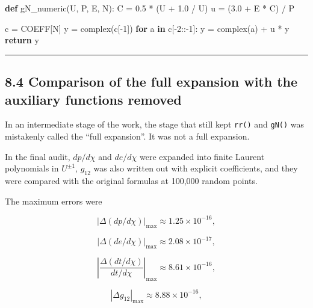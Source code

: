 \documentclass[
  a4paper,
]{article}
\newenvironment{Shaded}{}{}
\newcommand{\BuiltInTok}[1]{\textcolor[rgb]{0.00,0.50,0.00}{#1}}
\newcommand{\ControlFlowTok}[1]{\textcolor[rgb]{0.00,0.44,0.13}{\textbf{#1}}}
\newcommand{\DecValTok}[1]{\textcolor[rgb]{0.25,0.63,0.44}{#1}}
\newcommand{\FloatTok}[1]{\textcolor[rgb]{0.25,0.63,0.44}{#1}}
\newcommand{\KeywordTok}[1]{\textcolor[rgb]{0.00,0.44,0.13}{\textbf{#1}}}
\newcommand{\NormalTok}[1]{#1}
\newcommand{\OperatorTok}[1]{\textcolor[rgb]{0.40,0.40,0.40}{#1}}
\begin{document}
\begin{Shaded}
\begin{Highlighting}[]
\KeywordTok{def}\NormalTok{ gN\_numeric(U, P, E, N):}
\NormalTok{    C }\OperatorTok{=} \FloatTok{0.5} \OperatorTok{*}\NormalTok{ (U }\OperatorTok{+} \FloatTok{1.0} \OperatorTok{/}\NormalTok{ U)}
\NormalTok{    u }\OperatorTok{=}\NormalTok{ (}\FloatTok{3.0} \OperatorTok{+}\NormalTok{ E }\OperatorTok{*}\NormalTok{ C) }\OperatorTok{/}\NormalTok{ P}

\NormalTok{    c }\OperatorTok{=}\NormalTok{ COEFF[N]}
\NormalTok{    y }\OperatorTok{=} \BuiltInTok{complex}\NormalTok{(c[}\OperatorTok{{-}}\DecValTok{1}\NormalTok{])}
    \ControlFlowTok{for}\NormalTok{ a }\KeywordTok{in}\NormalTok{ c[}\OperatorTok{{-}}\DecValTok{2}\NormalTok{::}\OperatorTok{{-}}\DecValTok{1}\NormalTok{]:}
\NormalTok{        y }\OperatorTok{=} \BuiltInTok{complex}\NormalTok{(a) }\OperatorTok{+}\NormalTok{ u }\OperatorTok{*}\NormalTok{ y}
    \ControlFlowTok{return}\NormalTok{ y}
\end{Highlighting}
\end{Shaded}

\begin{center}\rule{0.5\linewidth}{0.5pt}\end{center}

\subsection{8.4 Comparison of the full expansion with the auxiliary
functions
removed}\label{comparison-of-the-full-expansion-with-the-auxiliary-functions-removed}

In an intermediate stage of the work, the stage that still kept
\texttt{rr()} and \texttt{gN()} was mistakenly called the ``full
expansion''. It was not a full expansion.

In the final audit, \(dp/d\chi\) and \(de/d\chi\) were expanded into
finite Laurent polynomials in \(U^{\pm1}\), \(g_{12}\) was also written
out with explicit coefficients, and they were compared with the original
formulas at 100,000 random points.

The maximum errors were

\[
|\Delta(dp/d\chi)|_{\max}
\approx1.25\times10^{-16},
\]

\[
|\Delta(de/d\chi)|_{\max}
\approx2.08\times10^{-17},
\]

\[
\left|\frac{\Delta(dt/d\chi)}{dt/d\chi}\right|_{\max}
\approx8.61\times10^{-16},
\]

\[
|\Delta g_{12}|_{\max}
\approx8.88\times10^{-16},
\]
\end{document}
